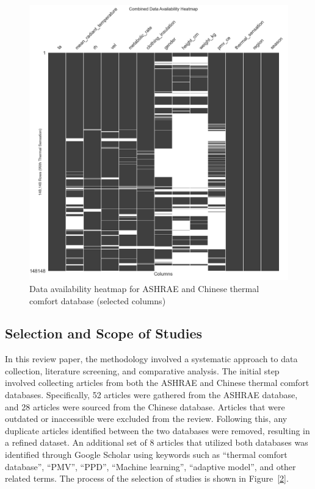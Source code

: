 \documentclass[final,3p,times,12pt]{elsarticle}
\begin{document}
\begin{figure}[h!]
    \centering
    \includegraphics[width=0.85\linewidth]{overall heatmap.png}
    \caption{Data availability heatmap for ASHRAE and Chinese thermal comfort database (selected columns)}
    \label{1}
\end{figure}

\subsection{Selection and Scope of Studies}
\label{subsec1}

In this review paper, the methodology involved a systematic approach to data collection, literature screening, and comparative analysis. The initial step involved collecting articles from both the ASHRAE and Chinese thermal comfort databases. Specifically, 52 articles were gathered from the ASHRAE database, and 28 articles were sourced from the Chinese database. Articles that were outdated or inaccessible were excluded from the review. Following this, any duplicate articles identified between the two databases were removed, resulting in a refined dataset. An additional set of 8 articles that utilized both databases was identified through Google Scholar using keywords such as “thermal comfort database”, “PMV”, “PPD”, “Machine learning”, “adaptive model”, and other related terms. The process of the selection of studies is shown in Figure~\ref{2}.
\end{document}
